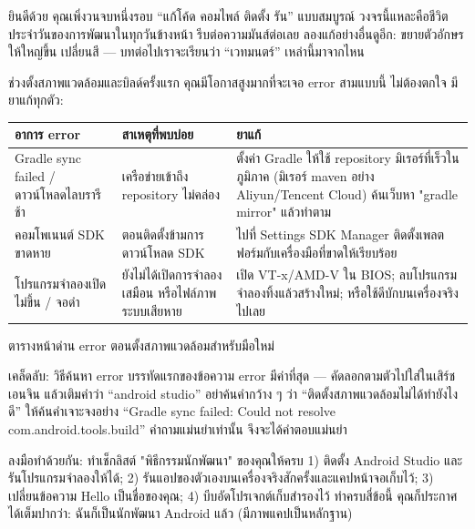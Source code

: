 ยินดีด้วย คุณเพิ่งวนจบหนึ่งรอบ “แก้โค้ด คอมไพล์ ติดตั้ง รัน” แบบสมบูรณ์ วงจรนี้แหละคือชีวิตประจำวันของการพัฒนาในทุกวันข้างหน้า รีบต่อความมันส์ต่อเลย ลองแก้อย่างอื่นดูอีก: ขยายตัวอักษรให้ใหญ่ขึ้น เปลี่ยนสี — บทต่อไปเราจะเรียนว่า “เวทมนตร์” เหล่านี้มาจากไหน


ช่วงตั้งสภาพแวดล้อมและบิลด์ครั้งแรก คุณมีโอกาสสูงมากที่จะเจอ error สามแบบนี้ ไม่ต้องตกใจ มียาแก้ทุกตัว:

\begin{center}
\begin{tabularx}{\linewidth}{|X|X|X|}
\hline
\textbf{อาการ error} & \textbf{สาเหตุที่พบบ่อย} & \textbf{ยาแก้} \tabularnewline
\hline
Gradle sync failed / ดาวน์โหลดไลบรารีช้า & เครือข่ายเข้าถึง repository ไม่คล่อง & ตั้งค่า Gradle ให้ใช้ repository มิเรอร์ที่เร็วในภูมิภาค (มิเรอร์ maven อย่าง Aliyun/Tencent Cloud) ค้นเว็บหา "gradle mirror" แล้วทำตาม \tabularnewline
คอมโพเนนต์ SDK ขาดหาย & ตอนติดตั้งข้ามการดาวน์โหลด SDK & ไปที่ Settings SDK Manager ติดตั้งเพลตฟอร์มกับเครื่องมือที่ขาดให้เรียบร้อย \tabularnewline
โปรแกรมจำลองเปิดไม่ขึ้น / จอดำ & ยังไม่ได้เปิดการจำลองเสมือน หรือไฟล์ภาพระบบเสียหาย & เปิด VT-x/AMD-V ใน BIOS; ลบโปรแกรมจำลองทิ้งแล้วสร้างใหม่; หรือใช้ดีบักบนเครื่องจริงไปเลย \tabularnewline
\hline
\end{tabularx}
\end{center}

\begin{center}\small\color{gray}ตารางหน้าด่าน error ตอนตั้งสภาพแวดล้อมสำหรับมือใหม่\end{center}

\begin{tcbinfo}{เคล็ดลับ: วิธีค้นหา error}
บรรทัดแรกของข้อความ error มีค่าที่สุด — คัดลอกตามตัวไปใส่ในเสิร์ชเอนจิน แล้วเติมคำว่า “android studio” อย่าค้นคำกว้าง ๆ ว่า “ติดตั้งสภาพแวดล้อมไม่ได้ทำยังไงดี” ให้ค้นคำเจาะจงอย่าง “Gradle sync failed: Could not resolve com.android.tools.build” คำถามแม่นยำเท่านั้น จึงจะได้คำตอบแม่นยำ

\end{tcbinfo}

\begin{tcbpractice}{ลงมือทำด้วยกัน: ทำเช็กลิสต์ "พิธีกรรมนักพัฒนา" ของคุณให้ครบ}
1) ติดตั้ง Android Studio และรันโปรแกรมจำลองให้ได้; 2) รันแอปของตัวเองบนเครื่องจริงสักครั้งและแคปหน้าจอเก็บไว้; 3) เปลี่ยนข้อความ Hello เป็นชื่อของคุณ; 4) บีบอัดโปรเจกต์เก็บสำรองไว้ ทำครบสี่ข้อนี้ คุณก็ประกาศได้เต็มปากว่า: ฉันก็เป็นนักพัฒนา Android แล้ว (มีภาพแคปเป็นหลักฐาน)

\end{tcbpractice}

